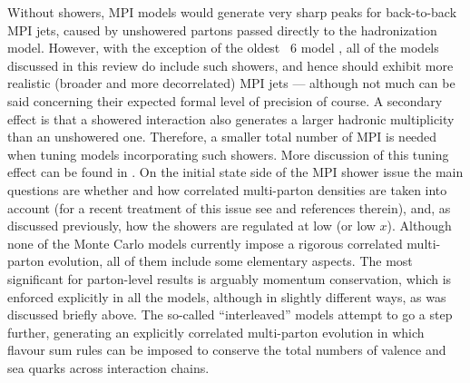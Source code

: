 Without showers, MPI models would generate very sharp peaks for back-to-back
MPI jets, caused by unshowered partons passed directly to the hadronization
model. However, with the exception of the oldest \pythia~6 model
\cite{Sjostrand:1987su}, all of the models discussed in this
review do include such showers, and hence should exhibit more
realistic (\ie  broader and
more decorrelated) MPI jets --- although not much can be said concerning
their expected formal level of precision of course. A secondary effect is that a
showered interaction also generates a larger hadronic
multiplicity than an unshowered one. Therefore, a smaller total number
of MPI is needed when tuning models incorporating such showers.
More discussion of this tuning effect can be found in
\cite{Buttar:2008jx,Skands:2010ak}.
On the initial state side of the MPI shower issue the main questions
are whether and how correlated multi-parton densities
are taken into account (for a recent treatment of this issue see \eg
\cite{Gaunt:2009re} and references therein), and, as discussed
previously, how the showers are regulated at low \pt (or low $x$).
Although none of the Monte Carlo models currently
impose a rigorous correlated multi-parton evolution, all of them
include some elementary aspects. The most significant for
parton-level results is arguably momentum conservation, which is
enforced explicitly in all the models, although in slightly different
ways, as was discussed briefly above. The so-called ``interleaved'' models
\cite{Sjostrand:2004pf,Sjostrand:2004ef} attempt to go a step
further, generating an explicitly correlated multi-parton evolution
in which flavour sum rules can be imposed to conserve \eg
the total numbers of valence and sea quarks across interaction chains.


